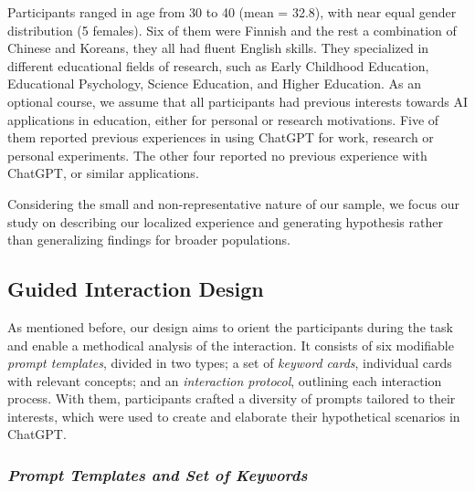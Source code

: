 \documentclass[sn-mathphys, Numbered]{sn-jnl}%
\theoremstyle{thmstyleone}%
\theoremstyle{thmstyletwo}%
\theoremstyle{thmstylethree}%
\begin{document}
Participants ranged in age from 30 to 40 (mean = 32.8), with near equal gender distribution (5 females). Six of them were Finnish and the rest a combination of Chinese and Koreans, they all had fluent English skills. They specialized in different educational fields of research, such as Early Childhood Education, Educational Psychology, Science Education, and Higher Education. As an optional course, we assume that all participants had previous interests towards AI applications in education, either for personal or research motivations. Five of them reported previous experiences in using ChatGPT for work, research or personal experiments. The other four reported no previous experience with ChatGPT, or similar applications. 

Considering the small and non-representative nature of our sample, we focus our study on describing our localized experience and generating hypothesis rather than generalizing findings for broader populations.  





\subsection*{Guided Interaction Design}\label{Interaction design}

As mentioned before, our design aims to orient the participants during the task and enable a methodical analysis of the interaction. It consists of six modifiable \textit{prompt templates}, divided in two types; a set of \textit{keyword cards}, individual cards with relevant concepts; and an \textit{interaction protocol}, outlining each interaction process. With them, participants crafted a diversity of prompts tailored to their interests, which were used to create and elaborate their hypothetical scenarios in ChatGPT. 

\subsubsection*{\textit{Prompt Templates and Set of Keywords}}
\end{document}
